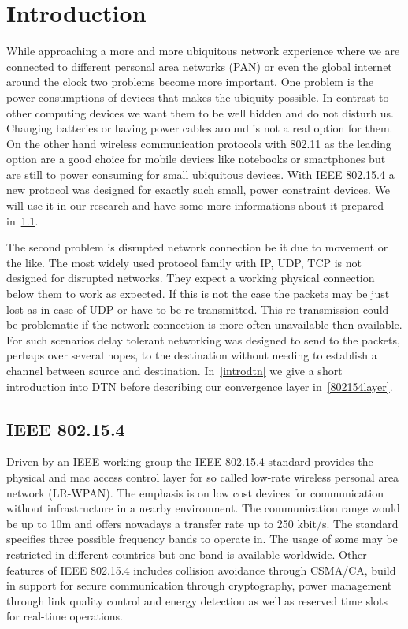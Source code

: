 \chapter{Introduction}
While approaching a more and more ubiquitous network experience where we are
connected to different personal area networks (PAN) or even the global internet
around the clock two problems become more important. One problem is the power
consumptions of devices that makes the ubiquity possible. In contrast to other
computing devices we want them to be well hidden and do not disturb us. Changing
batteries or having power cables around is not a real option for them. On the
other hand wireless communication protocols with 802.11 \cite{ieee80211} as the
leading option are a good choice for mobile devices like notebooks or
smartphones but are still to power consuming for small ubiquitous devices.
With IEEE 802.15.4 \cite{ieee802154} a new protocol was designed for exactly such
small, power constraint devices. We will use it in our research and have some
more informations about it prepared in~\ref{intro802154}.

The second problem is disrupted network connection be it due to movement or
the like. The most widely used protocol family with IP, UDP, TCP is not
designed for disrupted networks. They expect a working physical connection below
them to work as expected. If this is not the case the packets may be just lost
as in case of UDP or have to be re-transmitted. This re-transmission could be
problematic if the network connection is more often unavailable then available.
For such scenarios delay tolerant networking was designed to send to the
packets, perhaps over several hopes, to the destination without needing to
establish a channel between source and destination. In~\ref{introdtn} we give a
short introduction into DTN before describing our convergence layer
in~\ref{802154layer}.

\section{IEEE 802.15.4}
\label{intro802154}
Driven by an IEEE working group the IEEE 802.15.4 standard provides the physical and
mac access control layer for so called low-rate wireless personal area network
(LR-WPAN). The emphasis is on low cost devices for communication without
infrastructure in a nearby environment. The communication range would be up to
10m and offers nowadays a transfer rate up to 250 kbit/s. The standard specifies
three possible frequency bands to operate in. The usage of some may be
restricted in different countries but one band is available worldwide. Other
features of IEEE 802.15.4 includes collision avoidance through CSMA/CA, build in
support for secure communication through cryptography, power management through
link quality control and energy detection as well as reserved time slots for
real-time operations.

